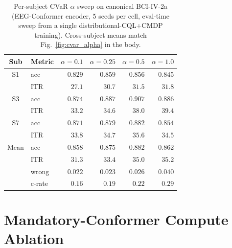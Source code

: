 \documentclass[conference]{IEEEtran}
\newcommand{\bcia}{BCI-IV-2a}
\begin{document}
\begin{table}[H]
\centering
\caption{Per-subject CVaR $\alpha$ sweep on canonical \bcia{}
(EEG-Conformer encoder, 5 seeds per cell, eval-time sweep from a
single distributional-CQL+CMDP training). Cross-subject means
match Fig.~\ref{fig:cvar_alpha} in the body.}
\label{tab:app:cvar_alpha}
\scriptsize
\setlength{\tabcolsep}{3pt}
\begin{tabular}{@{}c l r r r r@{}}
\toprule
Sub & Metric & $\alpha\!=\!0.1$ & $\alpha\!=\!0.25$ & $\alpha\!=\!0.5$ & $\alpha\!=\!1.0$ \\
\midrule
S1 & acc & $0.829$ & $0.859$ & $0.856$ & $0.845$ \\
   & ITR & $27.1$  & $30.7$  & $31.5$  & $31.8$  \\
S3 & acc & $0.874$ & $0.887$ & $0.907$ & $0.886$ \\
   & ITR & $33.2$  & $34.6$  & $38.0$  & $39.4$  \\
S7 & acc & $0.871$ & $0.879$ & $0.882$ & $0.854$ \\
   & ITR & $33.8$  & $34.7$  & $35.6$  & $34.5$  \\
\midrule
Mean & acc      & $0.858$ & $0.875$ & $0.882$ & $0.862$ \\
     & ITR      & $31.3$  & $33.4$  & $35.0$  & $35.2$  \\
     & wrong    & $0.022$ & $0.023$ & $0.026$ & $0.040$ \\
     & c-rate   & $0.16$  & $0.19$  & $0.22$  & $0.29$  \\
\bottomrule
\end{tabular}
\end{table}

\section{Mandatory-Conformer Compute Ablation}\label{app:conformer_2k}
\end{document}
